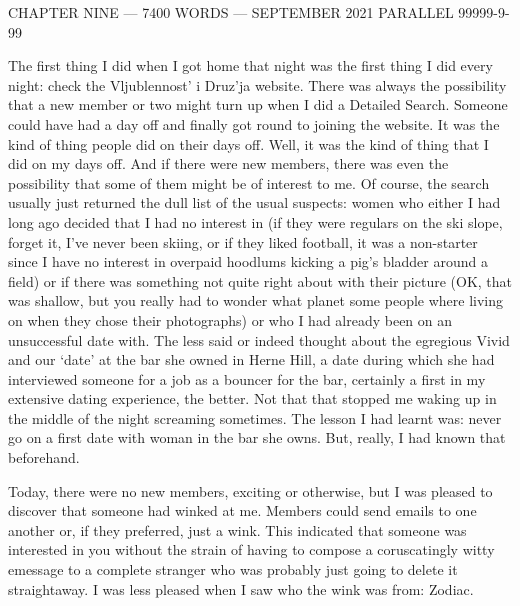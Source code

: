 {\parindent=0pt {\obeylines
{\twelvess CHAPTER NINE --- 7400 WORDS --- SEPTEMBER 2021}
{\twelvess PARALLEL 99999-9-99}}
\vskip 1cm

\twelverm
The first thing I did when I got home that night was the first thing
I did every night: check the Vljublennost' i Druz'ja website. There
was always the possibility that a new member or two might turn up
when I did a Detailed Search. Someone could have had a day off and
finally got round to joining the website. It was the kind of thing
people did on their days off. Well, it was the kind of thing that I
did on my days off. And if there were new members, there was even
the possibility that some of them might be of interest to me. Of
course, the search usually just returned the dull list of the usual
suspects: women who either I had long ago decided that I had no
interest in (if they were regulars on the ski slope, forget it, I've
never been skiing, or if they liked football, it was a non-starter
since I have no interest in overpaid hoodlums kicking a pig's bladder around
a field) or if there was something not quite right about with their
picture (OK, that was shallow, but you really had to wonder what
planet some people where living on when they chose their
photographs) or who I had already been on an unsuccessful date with.
The less said or indeed thought about the egregious Vivid and our
`date' at the bar she owned in Herne Hill, a date during which she
had interviewed someone for a job as a bouncer for the bar,
certainly a first in my extensive dating experience, the better. Not
that that stopped me waking up in the middle of the night screaming
sometimes. The lesson I had learnt was: never go on a first date
with woman in the bar she owns. But, really, I had known that
beforehand.}

Today, there were no new members, exciting or otherwise, but I was
pleased to discover that someone had winked at me. Members could
send emails to one another or, if they preferred, just a wink. This
indicated that someone was interested in you without the strain of
having to compose a coruscatingly witty emessage to a complete
stranger who was probably just going to delete it straightaway. I
was less pleased when I saw who the wink was from: Zodiac.

